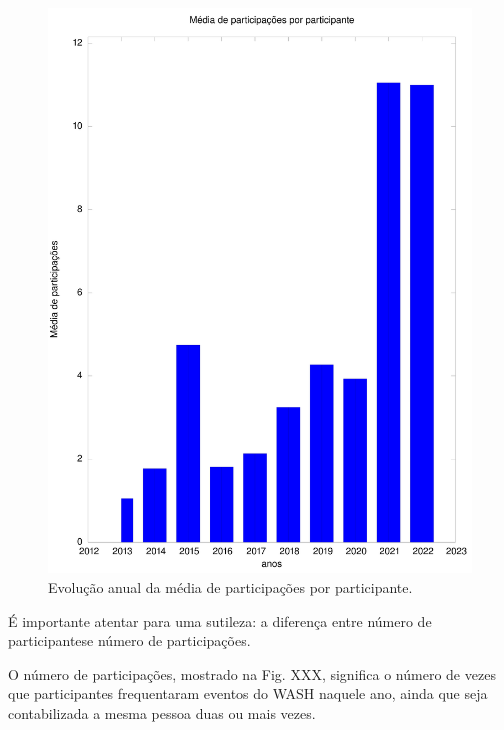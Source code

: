\documentclass[
12pt,		%
openright,	%
twoside,  %
a4paper,			%
chapter=TITLE,		%
english,			%
french,				%
spanish,			%
brazil				%
]{USPSC-classe/USPSC}
\begin{document}
\begin{figure}[max size={\textwidth}{\textheight}]
\begin{minipage}[b]{0.4\linewidth}
                \includegraphics[width=1.0\linewidth]{../../imagens/output-media-participacoes.jpeg}
                \caption{Evolu\c{c}\~ao anual da m\'edia de participa\c{c}\~oes por participante.}
                \label{a8f2d72073b88290f9b8731b144383d2f7c4dc4b}
\end{minipage}%
\hspace{0.5cm}
\end{figure}



\'E importante atentar para uma sutileza: a diferen\c{c}a entre \textquotedbl n\'umero de participantes\textquotedbl  e \textquotedbl n\'umero de participa\c{c}\~oes\textquotedbl .










O n\'umero de participa\c{c}\~oes, mostrado na Fig. XXX, significa o n\'umero de vezes que participantes frequentaram eventos do WASH naquele ano, ainda que seja contabilizada a mesma pessoa duas ou mais vezes.
\end{document}
